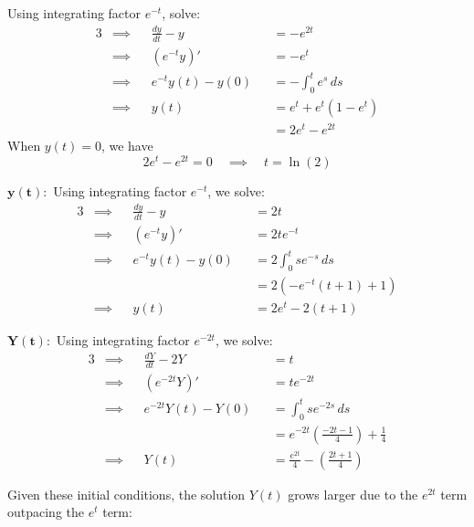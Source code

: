 \documentclass[a4paper]{article}
\begin{document}
Using integrating factor \(e^{-t}\), solve:
\begin{alignat*}{3}
	&\implies && \frac{d y}{d t} - y && = -e^{2t} \\
	&\implies && \!\left( e^{-t}y \right)' && = -e^{t} \\ 
	&\implies && e^{-t} y \!\left( t \right) - y \!\left( 0 \right) && = -\int^{t}_{0} e^{s} \, ds \\
	&\implies && y \!\left( t \right) && = e^{t} + e^{t} \!\left( 1 - e^{t} \right) \\
	& && && = 2e^{t} - e^{2t}
\end{alignat*}
When \(y \!\left( t \right) = 0\), we have
\[
	2e^{t} - e^{2t} = 0 \quad \implies \quad t = \ln\left( 2 \right)
\]


\(\bm{y \!\left( t \right) :}\) Using integrating factor \(e^{-t}\), we solve:
\begin{alignat*}{3}
	&\implies && \frac{d y}{d t} - y && = 2t \\
	&\implies && \!\left( e^{-t}y \right)' && = 2te^{-t} \\ 
	&\implies && e^{-t} y \!\left( t \right) - y \!\left( 0 \right) && = 2 \int^{t}_{0} se^{-s} \, ds \\
	& && && = 2 \!\left( -e^{-t} \!\left( t + 1 \right) + 1 \right)   \\
	&\implies && y \!\left( t \right) && = 2e^{t} - 2 \!\left( t + 1 \right) 
\end{alignat*}

\(\bm{Y \!\left( t \right) :}\) Using integrating factor \(e^{-2t}\), we solve:
\begin{alignat*}{3}
	&\implies && \frac{d Y}{d t} - 2Y && = t \\
	&\implies && \!\left( e^{-2t}Y \right)' && = te^{-2t} \\ 
	&\implies && e^{-2t} Y \!\left( t \right) - Y \!\left( 0 \right) && = \int^{t}_{0} se^{-2s} \, ds \\
	& && && = e^{-2t} \!\left( \frac{-2t - 1}{4} \right) + \frac{1}{4} \\
	&\implies && Y \!\left( t \right) && = \frac{e^{2t}}{4} -\!\left( \frac{2t + 1}{4} \right)
\end{alignat*}

Given these initial conditions, the solution \(Y \!\left( t \right) \) grows larger due to the \(e^{2t}\) term outpacing the \(e^{t}\) term:
\end{document}
